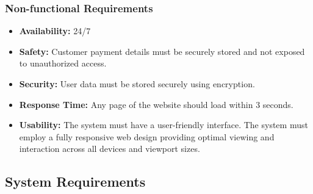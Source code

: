 \documentclass[a4paper,journal]{IEEEtran}
\begin{document}
\subsubsection{Non-functional Requirements}
\begin{itemize}
  \item \textbf{Availability:} 24/7
  \item \textbf{Safety:} Customer payment details must be
    securely stored and not exposed to unauthorized access.
  \item \textbf{Security:} User data must be stored
    securely using encryption.
  \item \textbf{Response Time:} Any page of the website
    should load within 3 seconds.
  \item \textbf{Usability:} The system must have a user-friendly interface.
    The system must employ a fully responsive web design
    providing optimal viewing and interaction across all devices and viewport
    sizes.
\end{itemize}
\subsection{System Requirements}
\end{document}
